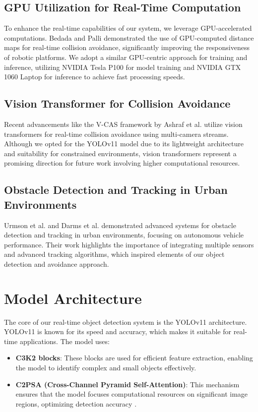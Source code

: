 \documentclass[12pt]{article}
\begin{document}
\subsection{GPU Utilization for Real-Time Computation}
To enhance the real-time capabilities of our system, we leverage GPU-accelerated computations. Bedada and Palli \cite{bedada2024real} demonstrated the use of GPU-computed distance maps for real-time collision avoidance, significantly improving the responsiveness of robotic platforms. We adopt a similar GPU-centric approach for training and inference, utilizing NVIDIA Tesla P100 for model training and NVIDIA GTX 1060 Laptop for inference to achieve fast processing speeds.

\subsection{Vision Transformer for Collision Avoidance}
Recent advancements like the V-CAS framework by Ashraf et al. \cite{ashraf2024v} utilize vision transformers for real-time collision avoidance using multi-camera streams. Although we opted for the YOLOv11 model due to its lightweight architecture and suitability for constrained environments, vision transformers represent a promising direction for future work involving higher computational resources.

\subsection{Obstacle Detection and Tracking in Urban Environments}
Urmson et al. \cite{urmson2008autonomous} and Darms et al. \cite{darms2008obstacle} demonstrated advanced systems for obstacle detection and tracking in urban environments, focusing on autonomous vehicle performance. Their work highlights the importance of integrating multiple sensors and advanced tracking algorithms, which inspired elements of our object detection and avoidance approach.

\section{Model Architecture}

The core of our real-time object detection system is the YOLOv11 architecture. YOLOv11 is known for its speed and accuracy, which makes it suitable for real-time applications. The model uses:

\begin{itemize}
    \item \textbf{C3K2 blocks}: These blocks are used for efficient feature extraction, enabling the model to identify complex and small objects effectively.
    \item \textbf{C2PSA (Cross-Channel Pyramid Self-Attention)}: This mechanism ensures that the model focuses computational resources on significant image regions, optimizing detection accuracy \cite{ashraf2024v}.
\end{itemize}
\end{document}
